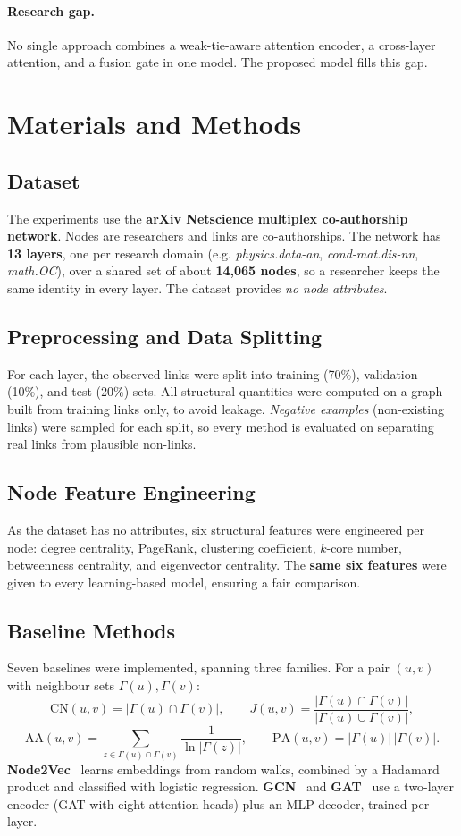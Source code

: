\documentclass[11pt,a4paper]{article}
\newcommand{\G}{\Gamma}
\begin{document}
\paragraph{Research gap.}
No single approach combines a weak-tie-aware attention encoder, a cross-layer attention, and a
fusion gate in one model. The proposed model fills this gap.

\section{Materials and Methods}

\subsection{Dataset}
The experiments use the \textbf{arXiv Netscience multiplex co-authorship network}. Nodes are
researchers and links are co-authorships. The network has \textbf{13 layers}, one per research
domain (e.g. \emph{physics.data-an}, \emph{cond-mat.dis-nn}, \emph{math.OC}), over a shared set of
about \textbf{14{,}065 nodes}, so a researcher keeps the same identity in every layer. The dataset
provides \emph{no node attributes}.

\subsection{Preprocessing and Data Splitting}
For each layer, the observed links were split into training (70\%), validation (10\%), and test
(20\%) sets. All structural quantities were computed on a graph built from training links only, to
avoid leakage. \emph{Negative examples} (non-existing links) were sampled for each split, so every
method is evaluated on separating real links from plausible non-links.

\subsection{Node Feature Engineering}
As the dataset has no attributes, six structural features were engineered per node: degree
centrality, PageRank, clustering coefficient, $k$-core number, betweenness centrality, and
eigenvector centrality. The \textbf{same six features} were given to every learning-based model,
ensuring a fair comparison.

\subsection{Baseline Methods}
Seven baselines were implemented, spanning three families. For a pair $(u,v)$ with neighbour sets
$\G(u),\G(v)$:
\[
\mathrm{CN}(u,v)=|\G(u)\cap\G(v)|,\qquad
J(u,v)=\frac{|\G(u)\cap\G(v)|}{|\G(u)\cup\G(v)|},
\]
\[
\mathrm{AA}(u,v)=\!\!\sum_{z\in\G(u)\cap\G(v)}\!\!\frac{1}{\ln|\G(z)|},\qquad
\mathrm{PA}(u,v)=|\G(u)|\,|\G(v)|.
\]
\textbf{Node2Vec}~\cite{node2vec} learns embeddings from random walks, combined by a Hadamard product
and classified with logistic regression. \textbf{GCN}~\cite{gcn} and \textbf{GAT}~\cite{gat} use a
two-layer encoder (GAT with eight attention heads) plus an MLP decoder, trained per layer.
\end{document}
